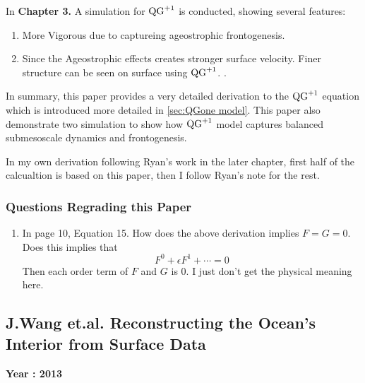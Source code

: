 \documentclass[../SQG_notes.tex]{subfiles}
\begin{document}
    In \textbf{Chapter 3.} A simulation for $\text{QG}^{+1}$ is conducted, showing several features:
    \begin{enumerate}
        \item More Vigorous due to captureing ageostrophic frontogenesis.
        \item Since the Ageostrophic effects creates stronger surface velocity. Finer structure can be seen on surface using $\text{QG}^{+1}$. .
    \end{enumerate}
    In summary, this paper provides a very detailed derivation to the $\text{QG}^{+1}$ equation which is introduced more detailed in \ref{sec:QGone model}. This paper also demonstrate two simulation to show how $\text{QG}^{+1}$ model captures balanced submesoscale dynamics and frontogenesis.

    \begin{remark}
        In my own derivation following Ryan's work in the later chapter, first half of the calcualtion is based on this paper, then I follow Ryan's note for the rest. 
    \end{remark}

    \subsubsection{Questions Regrading this Paper}

    \begin{enumerate}
        \item In page 10, Equation 15. How does the above derivation implies $F = G = 0$. Does this implies that 
        \[ F^0 + \epsilon F^1 + \cdots = 0\]
        Then each order term of $F$ and $G$ is 0. I just don't get the physical meaning here. 
    \end{enumerate}

    \subsection{J.Wang et.al. Reconstructing the Ocean's Interior from Surface Data}
    \textbf{Year : 2013} \par
\end{document}
